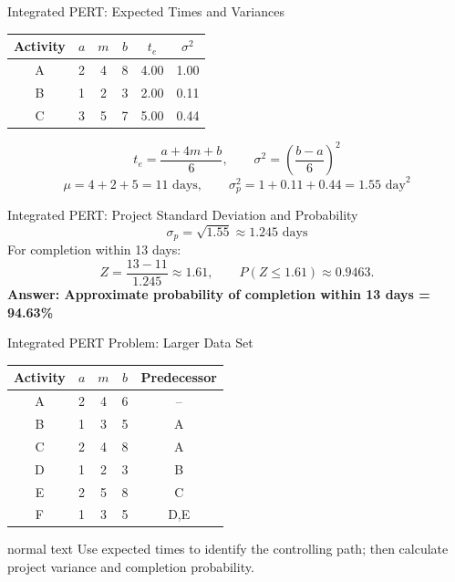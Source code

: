 \documentclass[aspectratio=169,10pt]{beamer}
\newcommand{\answer}[1]{\textbf{Answer: #1}}
\begin{document}
\begin{frame}{Integrated PERT: Expected Times and Variances}
\centering
\begin{tabular}{c|ccc|cc}
\toprule
Activity & $a$ & $m$ & $b$ & $t_e$ & $\sigma^2$\\
\midrule
A & 2 & 4 & 8 & 4.00 & 1.00\\
B & 1 & 2 & 3 & 2.00 & 0.11\\
C & 3 & 5 & 7 & 5.00 & 0.44\\
\bottomrule
\end{tabular}
\pause
\[
t_e=\frac{a+4m+b}{6},\qquad \sigma^2=\left(\frac{b-a}{6}\right)^2
\]
\[
\mu=4+2+5=11\text{ days},\qquad \sigma_p^2=1+0.11+0.44=1.55\text{ day}^2
\]
\end{frame}

\begin{frame}{Integrated PERT: Project Standard Deviation and Probability}
\[
\sigma_p=\sqrt{1.55}\approx1.245\text{ days}
\]
\pause
For completion within 13 days:
\[
Z=\frac{13-11}{1.245}\approx1.61,
\qquad P(Z\le1.61)\approx0.9463.
\]
\answer{Approximate probability of completion within 13 days = 94.63\%}
\end{frame}


\begin{frame}{Integrated PERT Problem: Larger Data Set}
\centering\small
\begin{tabular}{c|ccc|c}
\toprule Activity & $a$ & $m$ & $b$ & Predecessor\\
\midrule
A&2&4&6&--\\
B&1&3&5&A\\
C&2&4&8&A\\
D&1&2&3&B\\
E&2&5&8&C\\
F&1&3&5&D,E\\
\bottomrule
\end{tabular}
\vfill
\begin{beamercolorbox}[wd=0.90\textwidth,sep=0.16cm,center]{normal text}
\small Use expected times to identify the controlling path; then calculate project variance and completion probability.
\end{beamercolorbox}
\end{frame}
\end{document}
